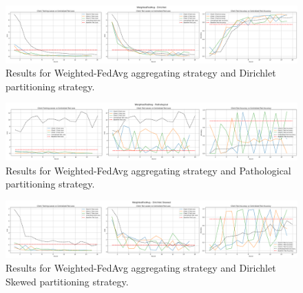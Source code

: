 \documentclass[11pt]{article}
\begin{document}
    \begin{figure}[h!]
        \centering
        \includegraphics[width=1\linewidth]{img/experiment_2/weightedfedavg-dirichlet}
        \caption{Results for Weighted-FedAvg aggregating strategy and Dirichlet partitioning strategy.}
        \label{fig:exp2-weightedfedavg-dirichlet}
    \end{figure}

    \begin{figure}[h!]
        \centering
        \includegraphics[width=1\linewidth]{img/experiment_2/weightedfedavg-pathological}
        \caption{Results for Weighted-FedAvg aggregating strategy and Pathological partitioning strategy.}
        \label{fig:exp2-weightedfedavg-pathological}
    \end{figure}

    \begin{figure}[h!]
        \centering
        \includegraphics[width=1\linewidth]{img/experiment_2/weightedfedavg-dirichlet-skewed}
        \caption{Results for Weighted-FedAvg aggregating strategy and Dirichlet Skewed partitioning strategy.}
        \label{fig:exp2-weightedfedavg-dirichlet-skewed}
    \end{figure}
\end{document}
